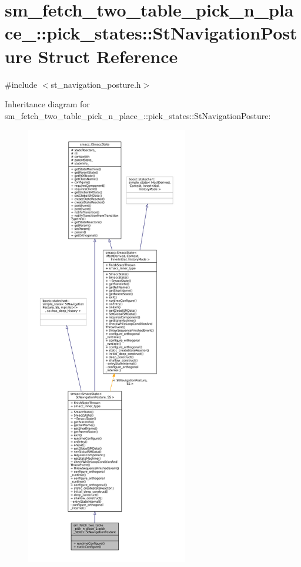 \hypertarget{structsm__fetch__two__table__pick__n__place__1_1_1pick__states_1_1StNavigationPosture}{}\section{sm\+\_\+fetch\+\_\+two\+\_\+table\+\_\+pick\+\_\+n\+\_\+place\+\_\+:\+:pick\+\_\+states\+:\+:St\+Navigation\+Posture Struct Reference}
\label{structsm__fetch__two__table__pick__n__place__1_1_1pick__states_1_1StNavigationPosture}


{\ttfamily \#include $<$st\+\_\+navigation\+\_\+posture.\+h$>$}



Inheritance diagram for sm\+\_\+fetch\+\_\+two\+\_\+table\+\_\+pick\+\_\+n\+\_\+place\+\_\+:\+:pick\+\_\+states\+:\+:St\+Navigation\+Posture\+:
\nopagebreak
\begin{figure}[H]
\begin{center}
\leavevmode
\includegraphics[height=550pt]{structsm__fetch__two__table__pick__n__place__1_1_1pick__states_1_1StNavigationPosture__inherit__graph}
\end{center}
\end{figure}


